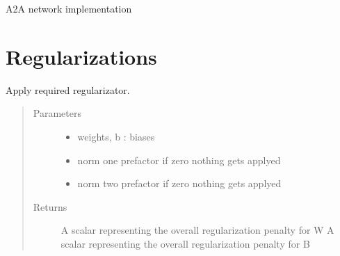 \documentclass[letterpaper,10pt,english]{sphinxmanual}
\begin{document}

\begin{fulllineitems}
\label{\detokenize{neuralnet/networks:networks.eval_network_A2A}}
A2A network implementation

\end{fulllineitems}



\chapter{Regularizations}
\label{\detokenize{neuralnet/regularizations:module-regularizations}}\label{\detokenize{neuralnet/regularizations:regularizations}}\label{\detokenize{neuralnet/regularizations::doc}}

\begin{fulllineitems}
\label{\detokenize{neuralnet/regularizations:regularizations.l1l2_regularizations}}
Apply required regularizator.
\begin{quote}\begin{description}
\item[{Parameters}] \leavevmode\begin{itemize}
\item {} 
 \textendash{} weights, b : biases

\item {} 
 \textendash{} norm one prefactor if zero nothing gets applyed

\item {} 
 \textendash{} norm two prefactor if zero nothing gets applyed

\end{itemize}

\item[{Returns}] \leavevmode
A scalar representing the overall regularization penalty for W
A scalar representing the overall regularization penalty for B

\end{description}\end{quote}

\end{fulllineitems}
\end{document}
